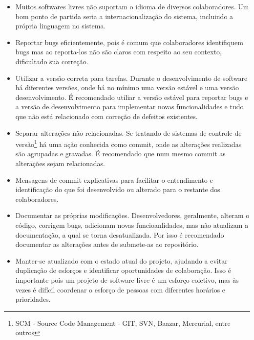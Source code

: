 \begin{itemize}
\begin{itemize}
		\item Muitos softwares livres não suportam o idioma de diversos colaboradores. Um bom ponto de partida seria a internacionalização do sistema, incluindo a própria linguagem no sistema.

		\item Reportar bugs eficientemente, pois é comum que colaboradores identifiquem bugs mas ao reporta-los não são claros com respeito ao seu contexto, dificultado sua correção.

		\item Utilizar a versão correta para tarefas. Durante o desenvolvimento de software há diferentes versões, onde há no mínimo uma versão estável e uma versão desenvolvimento. É recomendado utiliar a versão estável para reportar bugs e a versão de desenvolvimento para implementar novas funcionalidades e tudo que não está relacionado com correção de defeitos existentes.

		\item Separar alterações não relacionadas. Se tratando de sistemas de controle de versão\footnote{SCM - Source Code Management - GIT, SVN, Baazar, Mercurial, entre outros} há uma ação conhecida como commit, onde as alterações realizadas são agrupadas e gravadas. É recomendado que num mesmo commit as alterações sejam relacionadas.

		\item Mensagens de commit explicativas para facilitar o entendimento e identificação do que foi desenvolvido ou alterado para o restante dos colaboradores.

		\item Documentar as próprias modificações. Desenvolvedores, geralmente, alteram o código, corrigem bugs, adicionam novas funcioanlidades, mas não atualizam a documentação, a qual se torna desatualizada. Por isso é recomendado documentar as alterações antes de submete-as ao repositório.

		\item Manter-se atualizado com o estado atual do projeto, ajudando a evitar duplicação de esforços e identificar oportunidades de colaboração. Isso é importante pois um projeto de software livre é um esforço coletivo, mas às vezes é difícil coordenar o esforço de pessoas com diferentes horários e prioridades.

	\end{itemize}

\end{itemize}



